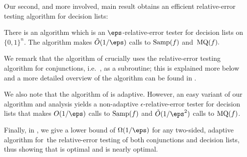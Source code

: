 \documentclass[11pt]{article}
\theoremstyle{definition}
\begin{document}
Our second, and more involved, main result obtains an efficient relative-error testing algorithm for decision lists:

\begin{theorem}  \label{thm:DL}
There is an
algorithm which is an  $\eps$-relative-error tester for decision lists on $\{0,1\}^n$. 
The algorithm makes 
$\tilde{O}(1/\eps)$ calls to $\mathrm{Samp}(f)$ and~$\mathrm{MQ}(f).$
\end{theorem} 

We remark that the algorithm of  crucially uses the relative-error testing algorithm for conjunctions, i.e.~, as a subroutine; this is explained more below and a more detailed overview of the algorithm can be found in .


We also note that the algorithm of  is adaptive. However, an easy variant of our algorithm and analysis yields a non-adaptive $\epsilon$-relative-error tester for decision lists that makes
$O(1/\eps)$ calls to $\mathrm{Samp}(f)$ and $\tilde{O}(1/\eps^2)$ calls to $\mathrm{MQ}(f)$.

Finally, in , we give a  lower bound of $\Omega(1/\eps)$ for any two-sided, adaptive algorithm for~the relative-error testing of both conjunctions and decision lists, thus showing that   is optimal and  is nearly optimal.\medskip\vspace{0.1cm}
\end{document}
